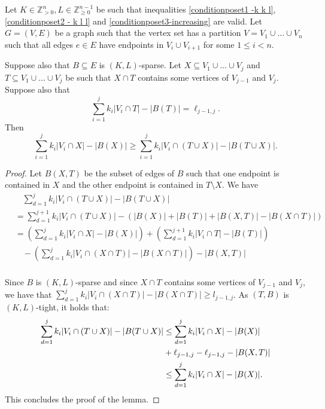 \documentclass{article}
\begin{document}
\begin{lemma}\label{Increase_when_tight - greedoids}
Let $K\in \mathbb{Z}_{>0}^{n}, L\in \mathbb{Z}_{\geq 0}^{n-1}$ be such that inequalities \eqref{conditionposet1 -k k l}, \eqref{conditionposet2 - k l l} and \eqref{conditionposet3-increasing} are valid. Let $G=(V,E)$ be a graph such that the vertex set has a partition $V=V_1\cup \dots \cup V_n$ such that all edges $e\in E$ have endpoints in $V_{i} \cup V_{i+1}$ for some $1 \leq i < n$. 

Suppose also that $B \subseteq E$ is $(K,L)$-sparse. Let $X\subseteq V_{1}\cup \dots \cup V_{j}$ and $T \subseteq V_{1}\cup \dots \cup V_{j}$ be such that $X\cap T$ contains some vertices of $V_{j-1}$ and $V_{j}$. Suppose also that
\begin{equation*}
\sum_{i=1}^{j} k_i |V_i\cap T| - |B(T)|  = \ell_{j-1, j}. 
\end{equation*}
Then
\begin{equation*}
\sum_{i=1}^{j} k_i |V_i \cap X| - |B(X)|  \geq \sum_{i=1}^{j} k_i |V_i\cap (T\cup X)| - |B(T\cup X)|. 
\end{equation*}
\end{lemma}
\begin{proof}
Let $B(X, T)$ be the subset of edges of $B$ such that one endpoint is contained in $X$ and the other endpoint is contained in $T\setminus X$.
We have
\begin{align*}
&\hspace{11pt} \sum_{d=1}^{j} k_i |V_i\cap(T\cup X)| - |B(T\cup X)|\\
  &=  \sum_{d=1}^{j+1} k_i |V_i \cap (T\cup X)| - \left( |B(X)| + |B(T)| + |B(X,T)|- |B(X\cap T)|\right)\\
&=  \left( \sum_{d=1}^{j} k_i |V_i\cap X|  - |B(X)| \right) +  \left( \sum_{d=1}^{j+1} k_i |V_i\cap T|  - |B(T)| \right)\\
 & \hspace{11pt} - \left( \sum_{d=1}^{j} k_i |V_i \cap (X\cap T)|  - |B(X\cap T)| \right) - |B(X, T)|\\
\end{align*}

Since $B$ is $(K,L)$-sparse and since $X\cap T$ contains some vertices of $V_{j-1}$ and $V_{j}$, we have that $\sum_{d=1}^{j} k_i |V_i\cap (X\cap T)| -|B(X \cap T)| \geq l_{j-1,j}$. As $(T,B)$ is $(K,L)$-tight, it holds that:
\begin{align*}
\sum_{d=1}^{j} k_i |V_i\cap(T\cup X)| - |B(T\cup X)| &\leq  \sum_{d=1}^{j} k_i |V_i\cap X| - |B(X)| \\
& \vspace{10pt}+ \ell_{j-1,j} -\ell_{j-1,j} - |B(X, T)|\\
&\leq \sum_{d=1}^{j} k_i |V_i\cap X| - |B(X)| .
\end{align*}
This concludes the proof of the lemma.
\end{proof}
\end{document}
